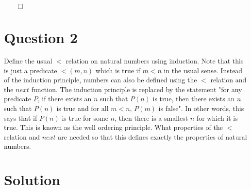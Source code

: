 \documentclass[12pt]{report}
\begin{document}
$\qed$



\section*{Question 2}
Define the usual $<$ relation on natural numbers using induction. Note that this is just a predicate $<(m, n)$ which is true if $m < n$ in the usual sense. Instead of the induction principle, numbers can also be defined using the $<$ relation and the $next$ function. The induction principle is replaced by the statement "for any predicate $P$, if there exists an $n$ such that $P(n)$ is true, then there exists an $n$ such that $P(n)$ is true and for all $m < n$, $P(m)$ is false". In other words, this says that if $P(n)$ is true for some $n$, then there is a smallest $n$ for which it is true. This is known as the well ordering principle. What properties of the $<$ relation and $next$ are needed so that this defines exactly the properties of natural numbers.
\section*{Solution}
\end{document}
